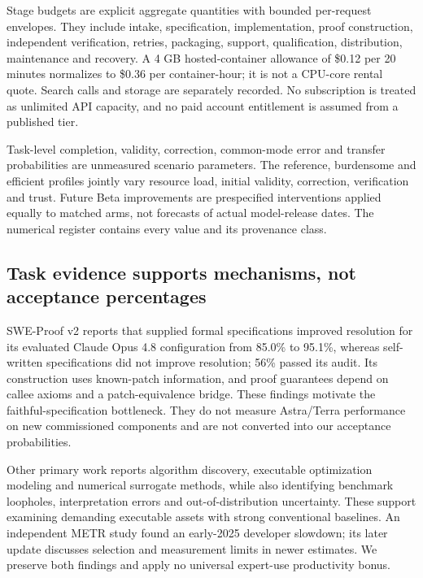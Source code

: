 \documentclass[11pt,letterpaper]{article}
\newcommand{\usd}[1]{\$#1}
\begin{document}
Stage budgets are explicit aggregate quantities with bounded per-request envelopes. They include intake, specification, implementation, proof construction, independent verification, retries, packaging, support, qualification, distribution, maintenance and recovery. A 4 GB hosted-container allowance of \usd{0.12} per 20 minutes normalizes to \usd{0.36} per container-hour; it is not a CPU-core rental quote. Search calls and storage are separately recorded. No subscription is treated as unlimited API capacity, and no paid account entitlement is assumed from a published tier.\cite{pricing}

Task-level completion, validity, correction, common-mode error and transfer probabilities are unmeasured scenario parameters. The reference, burdensome and efficient profiles jointly vary resource load, initial validity, correction, verification and trust. Future Beta improvements are prespecified interventions applied equally to matched arms, not forecasts of actual model-release dates. The numerical register contains every value and its provenance class.

\subsection{Task evidence supports mechanisms, not acceptance percentages}

SWE-Proof v2 reports that supplied formal specifications improved resolution for its evaluated Claude Opus 4.8 configuration from 85.0\% to 95.1\%, whereas self-written specifications did not improve resolution; 56\% passed its audit. Its construction uses known-patch information, and proof guarantees depend on callee axioms and a patch-equivalence bridge. These findings motivate the faithful-specification bottleneck. They do not measure Astra/Terra performance on new commissioned components and are not converted into our acceptance probabilities.\cite{sweproof}

Other primary work reports algorithm discovery, executable optimization modeling and numerical surrogate methods, while also identifying benchmark loopholes, interpretation errors and out-of-distribution uncertainty. These support examining demanding executable assets with strong conventional baselines. An independent METR study found an early-2025 developer slowdown; its later update discusses selection and measurement limits in newer estimates. We preserve both findings and apply no universal expert-use productivity bonus.\cite{alphaevolve,optimus,robust,metr,metrupdate}
\end{document}
